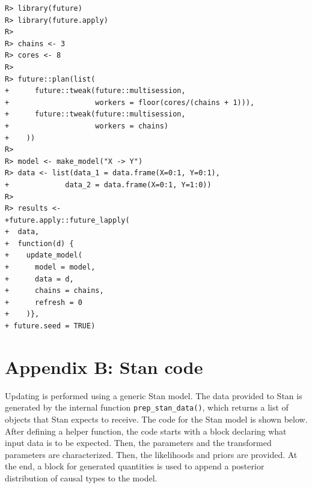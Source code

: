 \documentclass[
  11pt,
  article]{jss}
\begin{document}
\begin{verbatim}
R> library(future)
R> library(future.apply)
R> 
R> chains <- 3
R> cores <- 8
R> 
R> future::plan(list(
+      future::tweak(future::multisession, 
+                    workers = floor(cores/(chains + 1))),
+      future::tweak(future::multisession, 
+                    workers = chains)
+    ))
R> 
R> model <- make_model("X -> Y")
R> data <- list(data_1 = data.frame(X=0:1, Y=0:1), 
+             data_2 = data.frame(X=0:1, Y=1:0))
R> 
R> results <-
+future.apply::future_lapply(
+  data,
+  function(d) {
+    update_model(
+      model = model,
+      data = d,
+      chains = chains,
+      refresh = 0
+    )},
+ future.seed = TRUE)
\end{verbatim}

\newpage

\section*{Appendix B: Stan code}\label{sec-stancode}

Updating is performed using a generic Stan model. The data provided to
Stan is generated by the internal function \texttt{prep\_stan\_data()},
which returns a list of objects that Stan expects to receive. The code
for the Stan model is shown below. After defining a helper function, the
code starts with a block declaring what input data is to be expected.
Then, the parameters and the transformed parameters are characterized.
Then, the likelihoods and priors are provided. At the end, a block for
generated quantities is used to append a posterior distribution of
causal types to the model.
\end{document}
